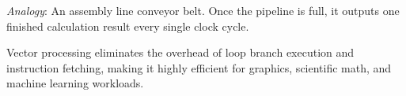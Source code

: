 \documentclass[11pt,a4paper]{article}
\begin{document}
\textit{Analogy}: An assembly line conveyor belt. Once the pipeline is full, it outputs one finished calculation result every single clock cycle.

Vector processing eliminates the overhead of loop branch execution and instruction fetching, making it highly efficient for graphics, scientific math, and machine learning workloads.
\end{document}
